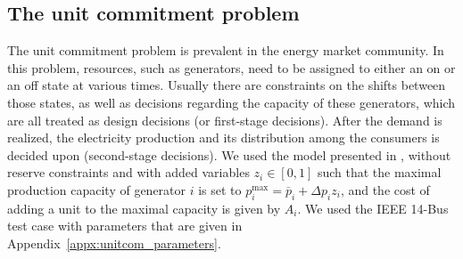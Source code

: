 \documentclass[12pt,x11names]{article}
\theoremstyle{definition}
\begin{document}
%

\subsection{The unit commitment problem}
The unit commitment problem is prevalent in the energy market community. In this problem, resources, such as generators, need to be assigned to either an on or an off state at various times. Usually there are constraints on the shifts between those states, as well as decisions regarding the capacity of these generators, which are all treated as design decisions (or first-stage decisions). After the demand is realized, the electricity production and its distribution among the consumers is decided upon (second-stage decisions). We used the model presented in \citep[Appendix]{Bertsimas2013}, without reserve constraints and with added variables
$z_i\in[0,1]$ such that the maximal production capacity of generator $i$ is set to $p^{\text{max}}_i=\overline{p}_i+\Delta{p}_i z_i$, and the cost of adding a unit to the maximal capacity is given by $A_i$. We used the IEEE 14-Bus test case with parameters that are given in Appendix~\ref{appx:unitcom_parameters}. 
\end{document}
